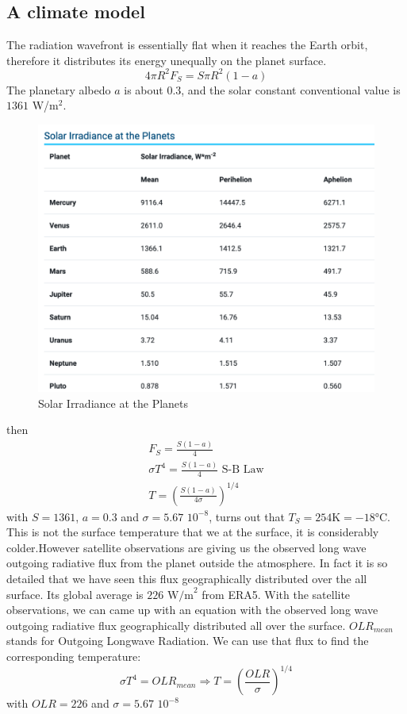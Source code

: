 \subsection{A climate model}
The radiation wavefront is essentially flat
when it reaches the Earth orbit, therefore it
distributes its energy unequally on the
planet surface.
\begin{equation}\label{e.radiation}
    4\pi R^2F_S=S\pi R^2(1-a)
\end{equation}
The planetary albedo $a$ is about $0.3$, and
the solar constant conventional value is $1361$ W/m$^2$.
\begin{figure}[h!]
    \centering
    \includegraphics[width=0.5\linewidth]{uploads/Screenshot 2024-11-19 154224.png}
    \caption{Solar Irradiance at the Planets}
    \label{fig:enter-label}
\end{figure}
then
\begin{align*}
    F_S=\frac{S(1-a)}{4}\\
    \sigma T^4= \frac{S(1-a)}{4} \,\,\text{S-B Law} \\
    T=\left(\frac{S(1-a)}{4\sigma}\right)^{1/4}
\end{align*}
with $S=1361$, $a=0.3$ and $\sigma=5.67 \, \, 10^{-8}$, turns out that $T_S=254\text{K}=-18°\text{C}$. This is not the surface temperature that we at the surface, it is considerably colder.However satellite observations are giving us the observed long wave outgoing radiative flux
from the planet outside the atmosphere. In fact it is so detailed that we have seen this flux geographically distributed over the all surface. Its global average is $226\, \, \text{W/m}^2$ from ERA5. With the satellite observations, we can came up with an equation with the observed long wave outgoing radiative flux geographically distributed all over the surface. $OLR_{mean}$ stands for Outgoing Longwave Radiation.
We can use that flux to find the corresponding temperature:
$$\sigma T^4=OLR_{mean}\Longrightarrow T=\left(\frac{OLR}{\sigma}\right)^{1/4}$$
with $OLR=226$ and $\sigma=5.67 \,\, 10^{-8}$
